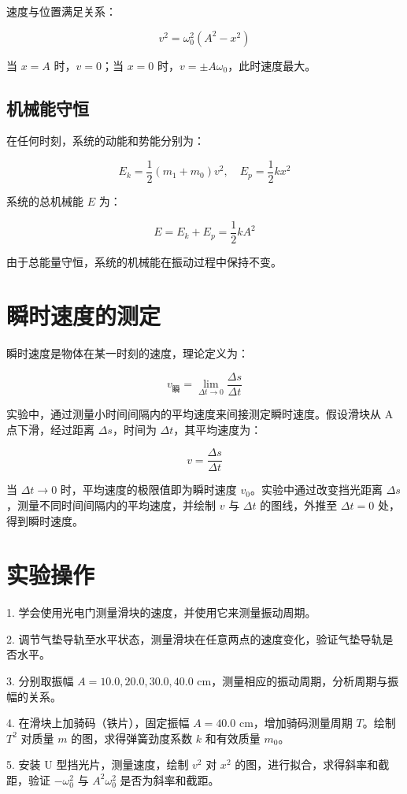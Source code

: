 \documentclass[a4paper,10pt]{article}
\begin{document}
速度与位置满足关系：

\[
v^2 = \omega_0^2 (A^2 - x^2)
\]

当 $x = A$ 时，$v = 0$；当 $x = 0$ 时，$v = \pm A \omega_0$，此时速度最大。

\subsection{机械能守恒}

在任何时刻，系统的动能和势能分别为：

\[
E_k = \frac{1}{2} (m_1 + m_0) v^2, \quad E_p = \frac{1}{2} k x^2
\]

系统的总机械能 $E$ 为：

\[
E = E_k + E_p = \frac{1}{2} k A^2
\]

由于总能量守恒，系统的机械能在振动过程中保持不变。

\section{瞬时速度的测定}

瞬时速度是物体在某一时刻的速度，理论定义为：

\[
v_{\text{瞬}} = \lim_{\Delta t \to 0} \frac{\Delta s}{\Delta t}
\]

实验中，通过测量小时间间隔内的平均速度来间接测定瞬时速度。假设滑块从 A 点下滑，经过距离 $\Delta s$，时间为 $\Delta t$，其平均速度为：

\[
v = \frac{\Delta s}{\Delta t}
\]

当 $\Delta t \to 0$ 时，平均速度的极限值即为瞬时速度 $v_0$。实验中通过改变挡光距离 $\Delta s$，测量不同时间间隔内的平均速度，并绘制 $v$ 与 $\Delta t$ 的图线，外推至 $\Delta t = 0$ 处，得到瞬时速度。


\section{实验操作}

1. 学会使用光电门测量滑块的速度，并使用它来测量振动周期。

2. 调节气垫导轨至水平状态，测量滑块在任意两点的速度变化，验证气垫导轨是否水平。

3. 分别取振幅 $A = 10.0, 20.0, 30.0, 40.0$ cm，测量相应的振动周期，分析周期与振幅的关系。

4. 在滑块上加骑码（铁片），固定振幅 $A = 40.0$ cm，增加骑码测量周期 $T$。绘制 $T^2$ 对质量 $m$ 的图，求得弹簧劲度系数 $k$ 和有效质量 $m_0$。

5. 安装 U 型挡光片，测量速度，绘制 $v^2$ 对 $x^2$ 的图，进行拟合，求得斜率和截距，验证 $- \omega_0^2$ 与 $A^2 \omega_0^2$ 是否为斜率和截距。
\end{document}
